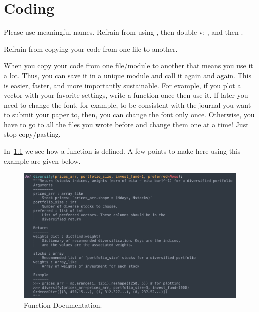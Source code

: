 \chapter{Coding}
\label{chap:Coding}



\begin{rem}
Please use meaningful names. Refrain from 
using , then double v; ,
and then .
\end{rem}


\begin{rem}
Refrain from copying your code from
one file to another.
\end{rem}
\noindent When you copy your code from one file/module
to another that means you use it a lot. Thus, you can
save it in a unique module and call it again and again.
This is easier, faster, and more importantly sustainable.
For example, if you plot a vector with your favorite settings,
write a function once then use it. If later you need
to change the font, for example, to be consistent with
the journal you want to submit your paper to, then, you can
change the font only once. Otherwise, you have to go to
all the files you wrote before and change them one at a time!
Just stop copy/pasting.

In~\cref{fig:FunctionDocumentation} we see how a function is defined.
A few points to make here using this example are given below.
\begin{figure}
  \centering
  \includegraphics[width=1\textwidth]{figures/function_documentation}
  \caption{Function Documentation.}
  \label{fig:FunctionDocumentation}
\end{figure}


